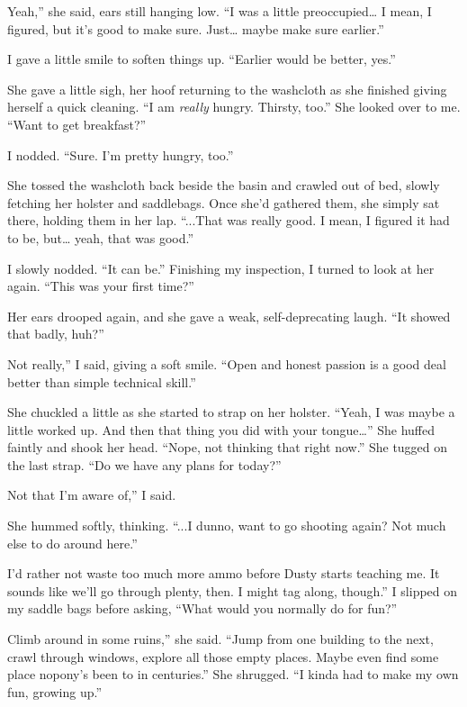 \leavevmode{}Yeah,” she said, ears still hanging low. “I was a little preoccupied… I mean, I figured, but it’s good to make sure. Just… maybe make sure earlier.”

I gave a little smile to soften things up. “Earlier would be better, yes.”

She gave a little sigh, her hoof returning to the washcloth as she finished giving herself a quick cleaning. “I am \textit{really} hungry. Thirsty, too.” She looked over to me. “Want to get breakfast?”

I nodded. “Sure. I’m pretty hungry, too.”

She tossed the washcloth back beside the basin and crawled out of bed, slowly fetching her holster and saddlebags. Once she’d gathered them, she simply sat there, holding them in her lap. “...That was really good. I mean, I figured it had to be, but… yeah, that was good.”

I slowly nodded. “It can be.” Finishing my inspection, I turned to look at her again. “This was your first time?”

Her ears drooped again, and she gave a weak, self-deprecating laugh. “It showed that badly, huh?”

\leavevmode{}Not really,” I said, giving a soft smile. “Open and honest passion is a good deal better than simple technical skill.”

She chuckled a little as she started to strap on her holster. “Yeah, I was maybe a little worked up. And then that thing you did with your tongue…” She huffed faintly and shook her head. “Nope, not thinking that right now.” She tugged on the last strap. “Do we have any plans for today?”

\leavevmode{}Not that I’m aware of,” I said.

She hummed softly, thinking. “...I dunno, want to go shooting again? Not much else to do around here.”

\leavevmode{}I’d rather not waste too much more ammo before Dusty starts teaching me. It sounds like we’ll go through plenty, then. I might tag along, though.” I slipped on my saddle bags before asking, “What would you normally do for fun?”

\leavevmode{}Climb around in some ruins,” she said. “Jump from one building to the next, crawl through windows, explore all those empty places. Maybe even find some place nopony’s been to in centuries.” She shrugged. “I kinda had to make my own fun, growing up.”

